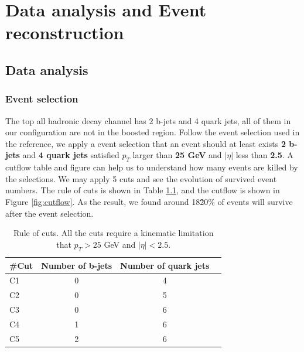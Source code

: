 \chapter{Data analysis and Event reconstruction}\label{section:Reconstruction}


\section{Data analysis}\label{sec:Data analysis}
\subsection{Event selection}\label{subsec:Event selection}
The top all hadronic decay channel has 2 b-jets and 4 quark jets, all of them in our configuration are not in the boosted region. Follow the event selection used in the reference\cite{Mccarthy:2015ucy},  we apply a event selection that an event should at least exists \textbf{2 b-jets} and \textbf{4 quark jets} satisfied $p_{T}$ larger than \textbf{25 GeV} and $|\eta|$ less than \textbf{2.5}. A cutflow table and figure can help us to understand how many events are killed by the selections. We may apply 5 cuts and see the evolution of survived event numbers. The rule of cuts is shown in Table \ref{table:cuts}, and the cutflow is shown in Figure \ref{fig:cutflow}. As the result, we found around 18\~20\% of events will survive after the event selection. 

\begin{center}
	\begin{table}[h]
		\begin{tabular}{p{} c c c }
			\cline{1-3}
			\#Cut    & Number of b-jets & Number of quark jets  \\
			\hline
			C1      &   0  & 4    \\
			C2      &   0  & 5    \\
			C3      &   0  & 6    \\
			C4      &   1  & 6    \\
			C5      &   2  & 6    \\
			\hline
		\end{tabular}
		\caption{Rule of cuts. All the cuts require a kinematic limitation that $p_{T} > 25$ GeV and $|\eta|<2.5$.}
		\label{table:cuts}
	\end{table}
\end{center}

